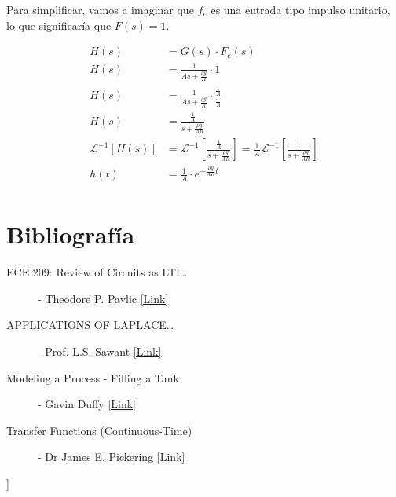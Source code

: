 \documentclass{article}
\begin{document}
Para simplificar, vamos a imaginar que $f_e$ es una entrada tipo impulso unitario, lo que significaría que $F\left(s\right) = 1$.

\begin{align*}
    H\left(s\right) &= G\left(s\right) \cdot F_e\left(s\right) \\
    H\left(s\right) &= \frac{1}{As + \frac{\rho g}{R}} \cdot 1 \\
    H\left(s\right) &= \frac{1}{As + \frac{\rho g}{R}} \cdot \frac{\frac{1}{A}}{\frac{1}{A}} \\
    H\left(s\right) &= \frac{\frac{1}{A}}{s + \frac{\rho g}{AR}} \\
    \mathcal{L}^{-1}\left[H\left(s\right)\right] &= \mathcal{L}^{-1}\left[\frac{\frac{1}{A}}{s + \frac{\rho g}{AR}}\right] = \frac{1}{A}\mathcal{L}^{-1}\left[\frac{1}{s + \frac{\rho g}{AR}}\right]\\
    h\left(t\right) &= \frac{1}{A} \cdot e^{-\frac{\rho g}{AR} t} \\
\end{align*}

\newpage

\section{Bibliografía}

\begin{description}
    \item[ECE 209: Review of Circuits as LTI\dots] - Theodore P. Pavlic \href{https://www.tedpavlic.com/teaching/osu/ece209/support/circuits_sys_review.pdf}{[Link]}
    \item[APPLICATIONS OF LAPLACE\dots] - Prof. L.S. Sawant \href{https://www.irjet.net/archives/V5/i5/IRJET-V5I5593.pdf}{[Link]}
    \item[Modeling a Process - Filling a Tank] - Gavin Duffy \href{https://eleceng.dit.ie/gavin/Control/Modeling/Filling%20a%20Tank.htm}{[Link]}
    \item[Transfer Functions (Continuous-Time)] - Dr James E. Pickering \href{https://www.youtube.com/playlist?list=PLWOqcVY--6BeiKryG_5hw0TCAsCde1sBL}{[Link]}
 \end{description}]
\end{document}
